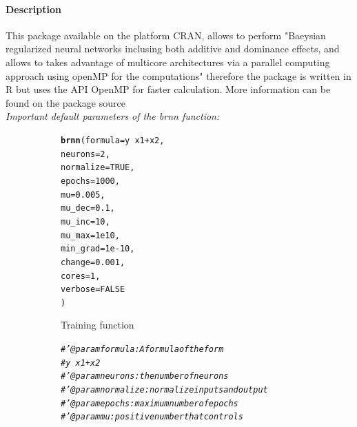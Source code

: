 \documentclass[letter,8pt]{article}\usepackage[]{graphicx}\usepackage[]{color}
\makeatletter
\newcommand{\hlnum}[1]{\textcolor[rgb]{0.686,0.059,0.569}{#1}}%
\newcommand{\hlcom}[1]{\textcolor[rgb]{0.678,0.584,0.686}{\textit{#1}}}%
\newcommand{\hlopt}[1]{\textcolor[rgb]{0,0,0}{#1}}%
\newcommand{\hlstd}[1]{\textcolor[rgb]{0.345,0.345,0.345}{#1}}%
\newcommand{\hlkwc}[1]{\textcolor[rgb]{0.333,0.667,0.333}{#1}}%
\newcommand{\hlkwd}[1]{\textcolor[rgb]{0.737,0.353,0.396}{\textbf{#1}}}%
\newenvironment{kframe}{%
 \def\at@end@of@kframe{}%
 \ifinner\ifhmode%
  \def\at@end@of@kframe{\end{minipage}}%
  \begin{minipage}{\columnwidth}%
 \fi\fi%
 \def\FrameCommand##1{\hskip\@totalleftmargin \hskip-\fboxsep
 \colorbox{shadecolor}{##1}\hskip-\fboxsep
     \hskip-\linewidth \hskip-\@totalleftmargin \hskip\columnwidth}%
 \MakeFramed {\advance\hsize-\width
   \@totalleftmargin\z@ \linewidth\hsize
   \@setminipage}}%
 {\par\unskip\endMakeFramed%
 \at@end@of@kframe}
\newenvironment{knitrout}{}{} %
\makeatother
\begin{document}
\paragraph{Description}
This package available on the platform CRAN, allows to perform "Baeysian regularized neural networks inclusing both additive and dominance effects, and allows to takes advantage of multicore architectures via a parallel computing approach using openMP for the computations" \cite{brnnarticle} therefore the package is written in R but uses the API OpenMP for faster calculation. More information can be found on the package source \cite{brnn2020}\\
\textit{Important default parameters of the brnn function:}
\begin{figure}[H]
  \begin{subfigure}{0.5\textwidth}
\begin{knitrout}
\color{fgcolor}\begin{kframe}
\begin{alltt}
\hlkwd{brnn}\hlstd{(}\hlkwc{formula}\hlstd{=  y} \hlopt{~} \hlstd{x1} \hlopt{+} \hlstd{x2,}
      \hlkwc{neurons}\hlstd{=}\hlnum{2}\hlstd{,}
      \hlkwc{normalize}\hlstd{=}\hlnum{TRUE}\hlstd{,}
      \hlkwc{epochs}\hlstd{=}\hlnum{1000}\hlstd{,}
      \hlkwc{mu}\hlstd{=}\hlnum{0.005}\hlstd{,}
      \hlkwc{mu_dec}\hlstd{=}\hlnum{0.1}\hlstd{,}
      \hlkwc{mu_inc}\hlstd{=}\hlnum{10}\hlstd{,}
      \hlkwc{mu_max}\hlstd{=}\hlnum{1e10}\hlstd{,}
      \hlkwc{min_grad}\hlstd{=}\hlnum{1e-10}\hlstd{,}
      \hlkwc{change} \hlstd{=} \hlnum{0.001}\hlstd{,}
      \hlkwc{cores}\hlstd{=}\hlnum{1}\hlstd{,}
      \hlkwc{verbose}\hlstd{=}\hlnum{FALSE}
     \hlstd{)}
\end{alltt}
\end{kframe}
\end{knitrout}
    \caption{Training function}
  \end{subfigure}
  \begin{subfigure}{0.5\textwidth}
    \centering
\begin{knitrout}
\color{fgcolor}\begin{kframe}
\begin{alltt}
\hlcom{#' @param formula : A formula of the form }
\hlcom{#         y ~ x1 + x2}
\hlcom{#' @param neurons : the number of neurons}
\hlcom{#' @param normalize : normalize inputs and output}
\hlcom{#' @param epochs : maximum number of epochs}
\hlcom{#' @param mu : positive number that controls }

\end{alltt}
\end{kframe}
\end{knitrout}
\end{subfigure}
\end{figure}
\end{document}
